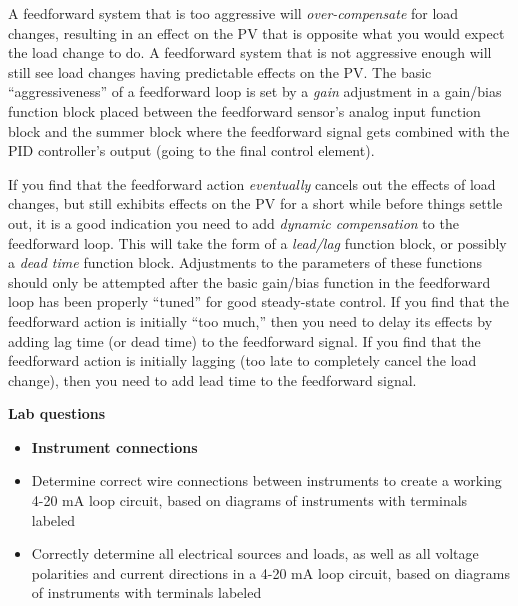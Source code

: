 \documentclass[12pt,a4paper]{article}
\begin{document}
A feedforward system that is too aggressive will {\it over-compensate} for load changes, resulting in an effect on the PV that is opposite what you would expect the load change to do.  A feedforward system that is not aggressive enough will still see load changes having predictable effects on the PV.  The basic ``aggressiveness'' of a feedforward loop is set by a {\it gain} adjustment in a gain/bias function block placed between the feedforward sensor's analog input function block and the summer block where the feedforward signal gets combined with the PID controller's output (going to the final control element).

If you find that the feedforward action {\it eventually} cancels out the effects of load changes, but still exhibits effects on the PV for a short while before things settle out, it is a good indication you need to add {\it dynamic compensation} to the feedforward loop.  This will take the form of a {\it lead/lag} function block, or possibly a {\it dead time} function block.  Adjustments to the parameters of these functions should only be attempted after the basic gain/bias function in the feedforward loop has been properly ``tuned'' for good steady-state control.  If you find that the feedforward action is initially ``too much,'' then you need to delay its effects by adding lag time (or dead time) to the feedforward signal.  If you find that the feedforward action is initially lagging (too late to completely cancel the load change), then you need to add lead time to the feedforward signal.






\vfil \eject

\noindent
{\bf Lab questions}

\vskip 5pt

\begin{itemize}
\item{} {\bf Instrument connections}
\item{} Determine correct wire connections between instruments to create a working 4-20 mA loop circuit, based on diagrams of instruments with terminals labeled
\item{} Correctly determine all electrical sources and loads, as well as all voltage polarities and current directions in a 4-20 mA loop circuit, based on diagrams of instruments with terminals labeled
\end{itemize}

\filbreak
\end{document}
